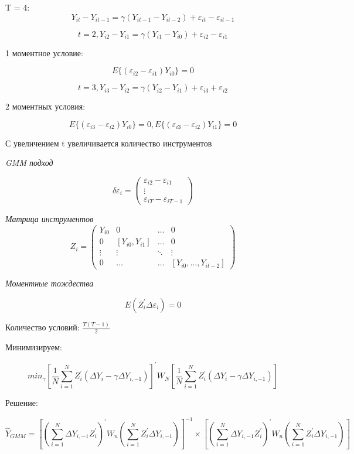 \documentclass[a4paper, 12pt]{article}
\begin{document}
T = 4:
\[Y_{it} - Y_{it - 1} = \gamma (Y_{it - 1} - Y_{it - 2}) + \varepsilon_{it} - \varepsilon_{it - 1}\]

\[t = 2, Y_{i2} - Y_{i1} = \gamma (Y_{i1} - Y_{i0}) + \varepsilon_{i2} - \varepsilon_{i1}\]

1 моментное условие:

\[E\{(\varepsilon_{i2} - \varepsilon_{i1})Y_{i0}\} = 0\]

\[t = 3, Y_{i3} - Y_{i2} = \gamma (Y_{i2} - Y_{i1}) + \varepsilon_{i3} + \varepsilon_{i2}\]

2 моментных условия:

\[E\{(\varepsilon_{i3} - \varepsilon_{i2})Y_{i0}\} = 0, 
E\{(\varepsilon_{i3} - \varepsilon_{i2})Y_{i1}\} = 0\]

С увеличением t увеличивается количество инструментов

\textit{GMM подход}

\[\delta \varepsilon_i = 
\begin{pmatrix}
    \varepsilon_{i2} - \varepsilon_{i1} \\
    \vdots \\
    \varepsilon_{iT} - \varepsilon_{iT-1}
\end{pmatrix}\]

\textit{Матрица инструментов}
\[Z_i = 
\begin{pmatrix}
    Y_{i0} & 0 & \ldots & 0 \\
    0 & [Y_{i0}, Y_{i1}] & \ldots & 0 \\
    \vdots & \vdots & \ddots & \vdots \\
    0 & \ldots & \ldots & [Y_{i0}, \ldots, Y_{it - 2}]
\end{pmatrix}\]

\textit{Моментные тождества}

\[E(Z_i^{\prime}\Delta \varepsilon_i) = 0\]

Количество условий: $\frac{T(T - 1)}{2}$

Минимизируем:

\[min_{\gamma} [\frac{1}{N}\sum_{i = 1}^N Z_i^{\prime}(\Delta Y_i - \gamma \Delta Y_{i, - 1})]^{\prime}
W_N[\frac{1}{N}\sum_{i = 1}^N Z_i^{\prime}(\Delta Y_i - \gamma \Delta Y_{i,- 1})]\]

Решение:

\[\hat{Y}_{GMM} = [(\sum_{i = 1}^N\Delta Y_{i,- 1}Z^{\prime}_i)^{\prime}
W_n(\sum_{i = 1}^N Z^{\prime}_i \Delta Y_{i,- 1})]^{-1} \times 
[(\sum_{i = 1}^N\Delta Y_{i,- 1}Z^{\prime}_i)^{\prime}
W_n(\sum_{i = 1}^N Z^{\prime}_i \Delta Y_{i,- 1})]\]
\end{document}
